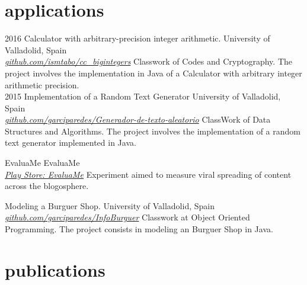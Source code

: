 \documentclass[]{friggeri-cv} %
\begin{document}
\section{applications}

\begin{entrylist}
  
  \entry
    {2016}
    {Calculator with arbitrary-precision integer arithmetic. }
    {University of Valladolid, Spain \\ 
    \href{https://github.com/ismtabo/cc_bigintegers}{\textit{github.com/ismtabo/cc\_bigintegers}}}
    {Classwork of Codes and Cryptography. The project involves the implementation in Java of a Calculator with  arbitrary integer arithmetic precision.}
    \\
  
  \entry
    {2015}
    {Implementation of a Random Text Generator}
    {University of Valladolid, Spain \\
    \href{https://github.com/garciparedes/Generador-de-texto-aleatorio}{\textit{github.com/garciparedes/Generador-de-texto-aleatorio}} }
    {ClassWork of Data Structures and Algorithms. The project involves the implementation of a random text generator implemented in Java.}
  
  \entry
    {}
    {EvaluaMe}
    {EvaluaMe \\
    \href{https://play.google.com/store/apps/details?id=com.garciparedes.evaluame}{\textit{Play Store: EvaluaMe}} }
    {Experiment aimed to measure viral spreading of content across the blogosphere.}
    
    \entry
    {}
    {Modeling a Burguer Shop.}
    {University of Valladolid, Spain \\ 
    \href{https://github.com/garciparedes/InfoBurguer}{\textit{github.com/garciparedes/InfoBurguer}}}
    {Classwork at Object Oriented Programming. The project consists in modeling an Burguer Shop  in Java.}

\end{entrylist}


\section{publications}
\end{document}
